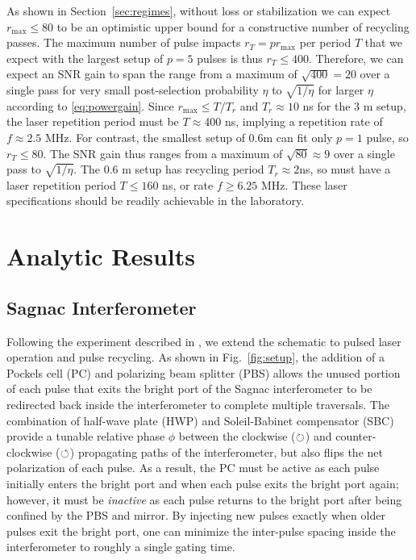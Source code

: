As shown in Section~\ref{sec:regimes}, without loss or stabilization we can expect $r_{\text{max}} \leq 80$ to be an optimistic upper bound for a constructive number of recycling passes.  The maximum number of pulse impacts $r_T = p r_{\text{max}}$ per period $T$ that we expect with the largest setup of $p=5$ pulses is thus $r_T \leq 400$.  Therefore, we can expect an SNR gain to span the range from a maximum of $\sqrt{400}=20$ over a single pass for very small post-selection probability $\eta$ to $\sqrt{1/\eta}$ for larger $\eta$ according to \eqref{eq:powergain}.  Since $r_{\text{max}} \le T / T_r$ and $T_r \approx 10$ ns for the $3$ m setup, the laser repetition period must be $T \approx 400$ ns, implying a repetition rate of $f \approx 2.5$ MHz.  For contrast, the smallest setup of $0.6$m can fit only $p = 1$ pulse, so $r_T \leq 80$.  The SNR gain thus ranges from a maximum of $\sqrt{80}\approx9$ over a single pass to $\sqrt{1/\eta}$.  The $0.6$ m setup has recycling period $T_r \approx 2$ns, so must have a laser repetition period $T \leq 160$ ns, or rate $f \geq 6.25$ MHz.  These laser specifications should be readily achievable in the laboratory.

\section{Analytic Results}\label{sec:collimated}
\subsection{Sagnac Interferometer}
Following the experiment described in \cite{Dixon2009,Starling2009,Howell2010}, we extend the schematic to pulsed laser operation and pulse recycling.  As shown in Fig.~\ref{fig:setup}, the addition of a Pockels cell (PC) and polarizing beam splitter (PBS) allows the unused portion of each pulse that exits the bright port of the Sagnac interferometer to be redirected back inside the interferometer to complete multiple traversals.  The combination of half-wave plate (HWP) and Soleil-Babinet compensator (SBC) provide a tunable relative phase $\phi$ between the clockwise ($\circlearrowright$) and counter-clockwise ($\circlearrowleft$) propagating paths of the interferometer, but also flips the net polarization of each pulse.  As a result, the PC must be active as each pulse initially enters the bright port and when each pulse exits the bright port again; however, it must be \emph{inactive} as each pulse returns to the bright port after being confined by the PBS and mirror.  By injecting new pulses exactly when older pulses exit the bright port, one can minimize the inter-pulse spacing inside the interferometer to roughly a single gating time.

